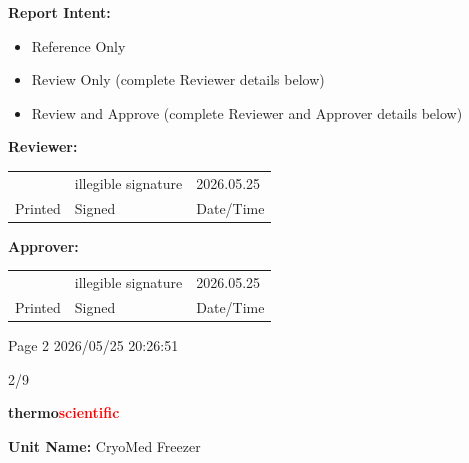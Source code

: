 \documentclass[UTF8,10pt,a4paper,fontset=fandol]{ctexart}
\newcommand{\fieldvalue}[1]{#1}
\newcommand{\handwritten}[1]{#1}
\begin{document}
\vspace{1em}

\textbf{Report Intent:}

\begin{itemize}
\item[$\square$] Reference Only
\item[$\square$] Review Only (complete Reviewer details below)
\item[$\square$] Review and Approve (complete Reviewer and Approver details below)
\end{itemize}

\textbf{Reviewer:}

\noindent
\begin{tabular}{p{3.2cm} p{3.2cm} p{3.2cm}}
\hrulefill & 
\fieldvalue{\handwritten{illegible signature}} &
\fieldvalue{\handwritten{2026.05.25}} \\
Printed & Signed & Date/Time
\end{tabular}

\vspace{0.8em}

\textbf{Approver:}

\noindent
\begin{tabular}{p{3.2cm} p{3.2cm} p{3.2cm}}
\hrulefill &
\fieldvalue{\handwritten{illegible signature}} &
\fieldvalue{\handwritten{2026.05.25}} \\
Printed & Signed & Date/Time
\end{tabular}

\vfill

 \hfill Page 2 \hfill 2026/05/25 20:26:51

\begin{flushright}
\handwritten{2/9}
\end{flushright}

\newpage

\begin{center}
\textbf{thermo\textcolor{red}{scientific}}
\end{center}

\noindent
\textbf{Unit Name:} 
\fieldvalue{CryoMed Freezer}
\end{document}
